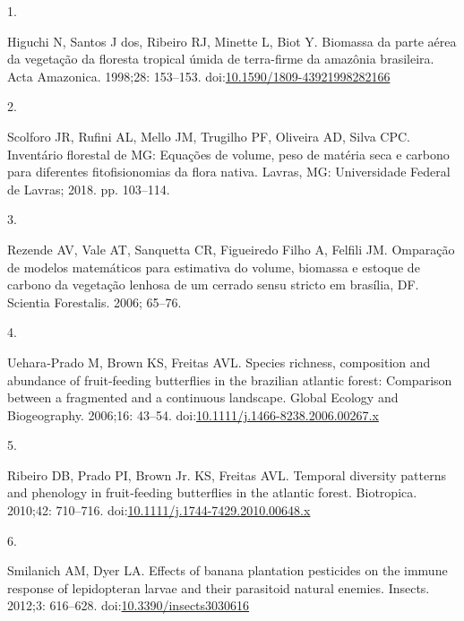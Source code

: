 \documentclass[
  letterpaper,
]{scrbook}
\newlength{\cslhangindent}
\newlength{\csllabelwidth}
\newenvironment{CSLReferences}[2] %
 {\begin{list}{}{%
  \setlength{\itemindent}{0pt}
  \setlength{\leftmargin}{0pt}
  \setlength{\parsep}{0pt}
  \ifodd #1
   \setlength{\leftmargin}{\cslhangindent}
   \setlength{\itemindent}{-1\cslhangindent}
  \fi
  \setlength{\itemsep}{#2\baselineskip}}}
 {\end{list}}
\newcommand{\CSLLeftMargin}[1]{\parbox[t]{\csllabelwidth}{\strut#1\strut}}
\newcommand{\CSLRightInline}[1]{\parbox[t]{\linewidth - \csllabelwidth}{\strut#1\strut}}
\begin{document}

\label{refs}
\begin{CSLReferences}{0}{1}
\CSLLeftMargin{1. }%
\CSLRightInline{Higuchi N, Santos J dos, Ribeiro RJ, Minette L, Biot Y.
Biomassa da parte aérea da vegetação da floresta tropical úmida de
terra-firme da amazônia brasileira. Acta Amazonica. 1998;28: 153--153.
doi:\href{https://doi.org/10.1590/1809-43921998282166}{10.1590/1809-43921998282166}}

\CSLLeftMargin{2. }%
\CSLRightInline{Scolforo JR, Rufini AL, Mello JM, Trugilho PF, Oliveira
AD, Silva CPC. Inventário florestal de MG: Equações de volume, peso de
matéria seca e carbono para diferentes fitofisionomias da flora nativa.
Lavras, MG: Universidade Federal de Lavras; 2018. pp. 103--114. }

\CSLLeftMargin{3. }%
\CSLRightInline{Rezende AV, Vale AT, Sanquetta CR, Figueiredo Filho A,
Felfili JM. Omparação de modelos matemáticos para estimativa do volume,
biomassa e estoque de carbono da vegetação lenhosa de um cerrado sensu
stricto em brasília, DF. Scientia Forestalis. 2006; 65--76. }

\CSLLeftMargin{4. }%
\CSLRightInline{Uehara‐Prado M, Brown KS, Freitas AVL. Species richness,
composition and abundance of fruit‐feeding butterflies in the brazilian
atlantic forest: Comparison between a fragmented and a continuous
landscape. Global Ecology and Biogeography. 2006;16: 43--54.
doi:\href{https://doi.org/10.1111/j.1466-8238.2006.00267.x}{10.1111/j.1466-8238.2006.00267.x}}

\CSLLeftMargin{5. }%
\CSLRightInline{Ribeiro DB, Prado PI, Brown Jr. KS, Freitas AVL.
Temporal diversity patterns and phenology in fruit‐feeding butterflies
in the atlantic forest. Biotropica. 2010;42: 710--716.
doi:\href{https://doi.org/10.1111/j.1744-7429.2010.00648.x}{10.1111/j.1744-7429.2010.00648.x}}

\CSLLeftMargin{6. }%
\CSLRightInline{Smilanich AM, Dyer LA. Effects of banana plantation
pesticides on the immune response of lepidopteran larvae and their
parasitoid natural enemies. Insects. 2012;3: 616--628.
doi:\href{https://doi.org/10.3390/insects3030616}{10.3390/insects3030616}}


\end{CSLReferences}
\end{document}
